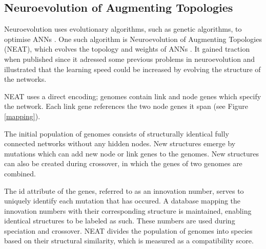 \newpage

\subsection{Neuroevolution of Augmenting Topologies}
Neuroevolution uses evolutionary algorithms, such as genetic algorithms, to optimise ANNs \cite{neuroevolution_review}.
One such algorithm is Neuroevolution of Augmenting Topologies (NEAT), which evolves the topology and weights of ANNs \cite{neat_main}.
It gained traction when published since it adressed some previous problems in neuroevolution and illustrated that the learning speed could
be increased by evolving the structure of the networks.

NEAT uses a direct encoding; genomes contain link and node genes which specify the network. Each link gene references
the two node genes it span (see Figure \ref{mapping}).



The initial population of genomes consists of structurally identical fully connected networks without any hidden nodes.
New structures emerge by mutations which can add new node or link genes to the genomes. New structures can also be created
during crossover, in which the genes of two genomes are combined.


\newline
The id attribute of the genes, referred to as an innovation number, serves to uniquely identify each mutation that has occured.
A database mapping the innovation numbers with their corresponding structure is maintained, enabling identical structures to be labeled as such.
These numbers are used during speciation and crossover. NEAT divides the population of genomes into species based on their structural
similarity, which is measured as a compatibility score.



\newline



